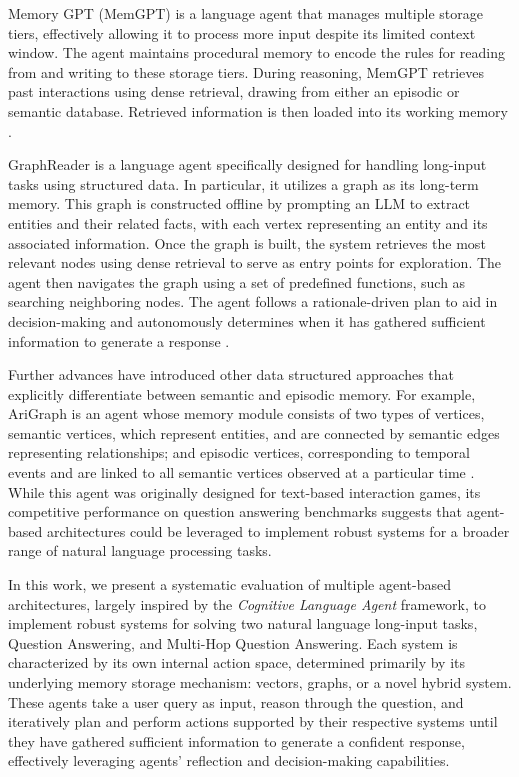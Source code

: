\noindent Memory GPT (MemGPT) is a language agent that manages multiple storage tiers, effectively allowing it to process more input despite its limited context window. The agent maintains procedural memory to encode the rules for reading from and writing to these storage tiers. During reasoning, MemGPT retrieves past interactions using dense retrieval, drawing from either an episodic or semantic database. Retrieved information is then loaded into its working memory \cite{packer2024memgptllmsoperatingsystems}.

\noindent GraphReader is a language agent specifically designed for handling long-input tasks using structured data. In particular, it utilizes a graph as its long-term memory. This graph is constructed offline by prompting an LLM to extract entities and their related facts, with each vertex representing an entity and its associated information. Once the graph is built, the system retrieves the most relevant nodes using dense retrieval to serve as entry points for exploration. The agent then navigates the graph using a set of predefined functions, such as searching neighboring nodes. The agent follows a rationale-driven plan to aid in decision-making and autonomously determines when it has gathered sufficient information to generate a response \cite{li2024graphreaderbuildinggraphbasedagent}.

\noindent Further advances have introduced other data structured approaches that explicitly differentiate between semantic and episodic memory. For example, AriGraph is an agent whose memory module consists of two types of vertices, semantic vertices, which represent entities, and are connected by semantic edges representing relationships; and episodic vertices, corresponding to temporal events and are linked to all semantic vertices observed at a particular time \cite{anokhin2024arigraphlearningknowledgegraph}. While this agent was originally designed for text-based interaction games, its competitive performance on question answering benchmarks suggests that agent-based architectures could be leveraged to implement robust systems for a broader range of natural language processing tasks.

\noindent In this work, we present a systematic evaluation of multiple agent-based architectures, largely inspired by the \textit{Cognitive Language Agent} framework, to implement robust systems for solving two natural language long-input tasks, Question Answering, and Multi-Hop Question Answering. Each system is characterized by its own internal action space, determined primarily by its underlying memory storage mechanism: vectors, graphs, or a novel hybrid system. These agents take a user query as input, reason through the question, and iteratively plan and perform actions supported by their respective systems until they have gathered sufficient information to generate a confident response, effectively leveraging agents' reflection and decision-making capabilities.




